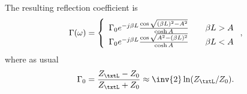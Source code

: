 The resulting reflection coefficient is
\begin{equation}\label{eqn:continuumAndOtherTransformersCore:1080}
\Gamma(\omega)
=
\left\{
\begin{array}{l l}
\Gamma_0 e^{-j \beta L} \frac{\cos\sqrt{(\beta L)^2 - A^2}}{\cosh A} & \quad \mbox{\( \beta L > A \)} \\
\Gamma_0 e^{-j \beta L} \frac{\cos\sqrt{A^2 - (\beta L)^2 }}{\cosh A} & \quad \mbox{\( \beta L < A \)} \\
\end{array}
\right.,
\end{equation}
where as usual
\begin{equation}\label{eqn:continuumAndOtherTransformersCore:1100}
\Gamma_0 = \frac{Z_\txtL - Z_0}{Z_\txtL + Z_0} \approx \inv{2} \ln (Z_\txtL/Z_0).
\end{equation}

